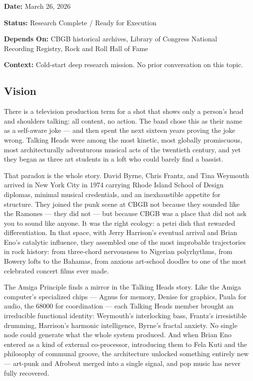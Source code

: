 \documentclass[11pt,letterpaper]{article}
\newcommand{\metafield}[2]{\textbf{\sffamily #1} #2\par}
\begin{document}
\metafield{Date:}{March 26, 2026}
\metafield{Status:}{Research Complete / Ready for Execution}
\metafield{Depends On:}{CBGB historical archives, Library of Congress National Recording Registry, Rock and Roll Hall of Fame}
\metafield{Context:}{Cold-start deep research mission. No prior conversation on this topic.}

\subsection{Vision}

There is a television production term for a shot that shows only a person's head and shoulders talking: all content, no action. The band chose this as their name as a self-aware joke --- and then spent the next sixteen years proving the joke wrong. Talking Heads were among the most kinetic, most globally promiscuous, most architecturally adventurous musical acts of the twentieth century, and yet they began as three art students in a loft who could barely find a bassist.

That paradox is the whole story. David Byrne, Chris Frantz, and Tina Weymouth arrived in New York City in 1974 carrying Rhode Island School of Design diplomas, minimal musical credentials, and an inexhaustible appetite for structure. They joined the punk scene at CBGB not because they sounded like the Ramones --- they did not --- but because CBGB was a place that did not ask you to sound like anyone. It was the right ecology: a petri dish that rewarded differentiation. In that space, with Jerry Harrison's eventual arrival and Brian Eno's catalytic influence, they assembled one of the most improbable trajectories in rock history: from three-chord nervousness to Nigerian polyrhythms, from Bowery lofts to the Bahamas, from anxious art-school doodles to one of the most celebrated concert films ever made.

The Amiga Principle finds a mirror in the Talking Heads story. Like the Amiga computer's specialized chips --- Agnus for memory, Denise for graphics, Paula for audio, the 68000 for coordination --- each Talking Heads member brought an irreducible functional identity: Weymouth's interlocking bass, Frantz's irresistible drumming, Harrison's harmonic intelligence, Byrne's fractal anxiety. No single node could generate what the whole system produced. And when Brian Eno entered as a kind of external co-processor, introducing them to Fela Kuti and the philosophy of communal groove, the architecture unlocked something entirely new --- art-punk and Afrobeat merged into a single signal, and pop music has never fully recovered.
\end{document}
